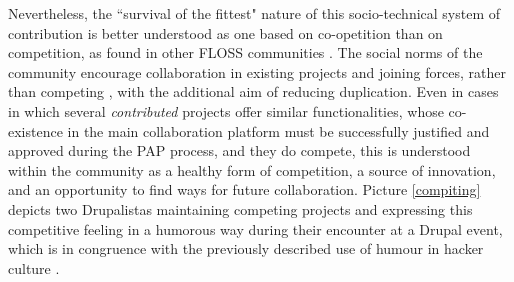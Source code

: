 Nevertheless, the ``survival of the fittest" nature of this socio-technical system of contribution is better understood as one based on co-opetition \parencite{brandenburger2011co} than on competition, as found in other FLOSS communities \parencite{west2006patterns, teixeira2014understanding}. The social norms of the community encourage collaboration in existing projects and joining forces, rather than competing \parencite{maintenance-guidelines:Online}, with the additional aim of reducing duplication. Even in cases in which several \textit{contributed} projects offer similar functionalities, whose co-existence in the main collaboration platform must be successfully justified and approved during the PAP process, and they do compete, this is understood within the community as a healthy form of competition, a source of innovation, and an opportunity to find ways for future collaboration. Picture \ref{compiting} depicts two Drupalistas maintaining competing projects and expressing this competitive feeling in a humorous way during their encounter at a Drupal event, which is in congruence with the previously described use of humour in hacker culture \textcite[116]{coleman2013coding}.


